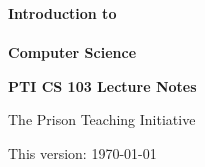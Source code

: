 \begin{titlepage}
    \vspace*{5cm}

    {\noindent \Huge \bfseries{Introduction to \\\\ Computer Science}}

    \vspace{3cm}

    {\noindent \large \textbf{PTI CS 103 Lecture Notes}}

    \vspace{1.5cm}

    {\noindent \large The Prison Teaching Initiative}

    \vfill

    {\noindent \small This version: \today}
\end{titlepage}